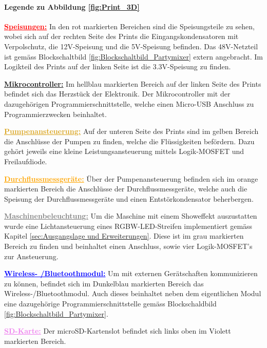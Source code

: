 \paragraph{Legende zu Abbildung \ref{fig:Print_3D}}\mbox{}

\textcolor{red}{\textbf{\underline{Speisungen:}}}
In den rot markierten Bereichen sind die Speisungsteile zu sehen, wobei sich auf der rechten Seite des Prints die Eingangskondensatoren mit Verpolschutz, die 12V-Speisung und die 5V-Speisung befinden. Das 48V-Netzteil ist gemäss Blockschaltbild \ref{fig:Blockschaltbild_Partymixer} extern angebracht. Im Logikteil des Prints auf der linken Seite ist die 3.3V-Speisung zu finden.

\textcolor{ProcessBlue}{\textbf{\underline{Mikrocontroller:}}}
Im hellblau markierten Bereich auf der linken Seite des Prints befindet sich das Herzstück der Elektronik. Der Mikrocontroller mit der dazugehörigen Programmierschnittstelle, welche einen Micro-USB Anschluss zu Programmierzwecken beinhaltet.

\textcolor{Goldenrod}{\textbf{\underline{Pumpenansteuerung:}}}
Auf der unteren Seite des Prints sind im gelben Bereich die Anschlüsse der Pumpen zu finden, welche die Flüssigkeiten befördern. Dazu gehört jeweils eine kleine Leistungsansteuerung mittels Logik-MOSFET und Freilaufdiode. 

\textcolor{orange}{\textbf{\underline{Durchflussmessgeräte:}}} Über der Pumpenansteuerung befinden sich im orange markierten Bereich die Anschlüsse der Durchflussmessgeräte, welche auch die Speisung der Durchflussmessgeräte und einen Entstörkondensator beherbergen.

\textcolor{gray}{\textbf{\underline{Maschinenbeleuchtung:}}}
Um die Maschine mit einem Showeffekt auszustatten wurde eine Lichtansteuerung eines RGBW-LED-Streifen implementiert gemäss Kapitel \ref{sec:Ausgangslage und Erweiterungen}. Diese ist im grau markierten Bereich zu finden und beinhaltet einen Anschluss, sowie vier Logik-MOSFET's zur Ansteuerung.

\textcolor{blue}{\textbf{\underline{Wireless- /Bluetoothmodul:}}}
Um mit externen Gerätschaften kommunizieren zu können, befindet sich im Dunkelblau markierten Bereich das Wireless-/Bluetoothmodul. Auch dieses beinhaltet neben dem eigentlichen Modul eine dazugehörige Programmierschnittstelle gemäss Blockschaldbild \ref{fig:Blockschaltbild_Partymixer}.

\textcolor{violet}{\textbf{\underline{SD-Karte:}}}
Der microSD-Kartenslot befindet sich links oben im Violett markierten Bereich.


